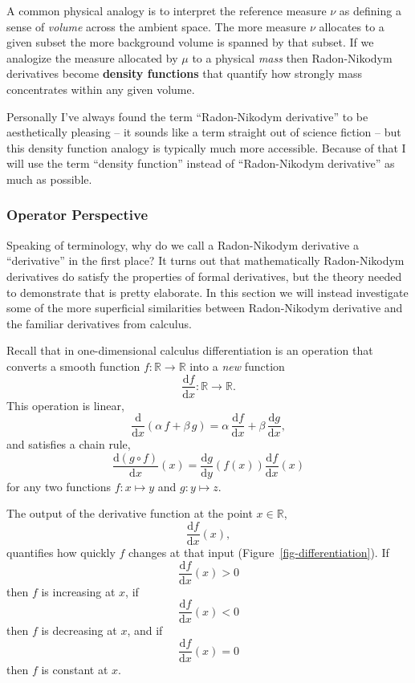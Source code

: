 \documentclass[
  letterpaper,
  DIV=11,
  numbers=noendperiod]{scrartcl}
\begin{document}
A common physical analogy is to interpret the reference measure \(\nu\)
as defining a sense of \emph{volume} across the ambient space. The more
measure \(\nu\) allocates to a given subset the more background volume
is spanned by that subset. If we analogize the measure allocated by
\(\mu\) to a physical \emph{mass} then Radon-Nikodym derivatives become
\textbf{density functions} that quantify how strongly mass concentrates
within any given volume.

Personally I've always found the term ``Radon-Nikodym derivative'' to be
aesthetically pleasing -- it sounds like a term straight out of science
fiction -- but this density function analogy is typically much more
accessible. Because of that I will use the term ``density function''
instead of ``Radon-Nikodym derivative'' as much as possible.

\hypertarget{operator-perspective}{%
\subsubsection{Operator Perspective}\label{operator-perspective}}

Speaking of terminology, why do we call a Radon-Nikodym derivative a
``derivative'' in the first place? It turns out that mathematically
Radon-Nikodym derivatives do satisfy the properties of formal
derivatives, but the theory needed to demonstrate that is pretty
elaborate. In this section we will instead investigate some of the more
superficial similarities between Radon-Nikodym derivative and the
familiar derivatives from calculus.

Recall that in one-dimensional calculus differentiation is an operation
that converts a smooth function \(f: \mathbb{R} \rightarrow \mathbb{R}\)
into a \emph{new} function \[
\frac{ \mathrm{d} f }{ \mathrm{d} x} :
\mathbb{R} \rightarrow \mathbb{R}.
\] This operation is linear, \[
\frac{ \mathrm{d} }{ \mathrm{d} x}
\left( \alpha \, f + \beta \, g \right)
=
  \alpha \, \frac{ \mathrm{d} f }{ \mathrm{d} x}
+ \beta \, \frac{ \mathrm{d} g }{ \mathrm{d} x},
\] and satisfies a chain rule, \[
\frac{ \mathrm{d} (g \circ f)}{ \mathrm{d} x}(x)
=
\frac{ \mathrm{d} g}{ \mathrm{d} y}(f(x))
\frac{ \mathrm{d} f}{ \mathrm{d} x}(x)
\] for any two functions \(f: x \mapsto y\) and \(g: y \mapsto z\).

The output of the derivative function at the point \(x \in \mathbb{R}\),
\[
\frac{ \mathrm{d} f }{ \mathrm{d} x}(x),
\] quantifies how quickly \(f\) changes at that input
(Figure~\ref{fig-differentiation}). If \[
\frac{ \mathrm{d} f }{ \mathrm{d} x}(x) > 0
\] then \(f\) is increasing at \(x\), if \[
\frac{ \mathrm{d} f }{ \mathrm{d} x}(x) < 0
\] then \(f\) is decreasing at \(x\), and if \[
\frac{ \mathrm{d} f }{ \mathrm{d} x}(x) = 0
\] then \(f\) is constant at \(x\).
\end{document}
